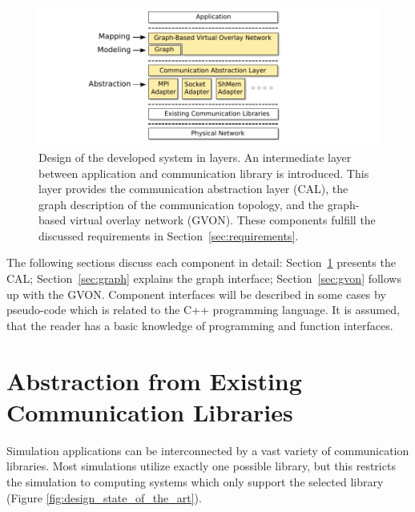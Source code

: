 \begin{figure}[H]
  \centering \includegraphics[width=\textwidth]{graphics/30_design}
  \caption{Design of the developed system in layers. An intermediate
    layer between application and communication library is introduced.
    This layer provides the communication abstraction layer (CAL), the
    graph description of the communication topology, and the
    graph-based virtual overlay network (GVON). These components
    fulfill the discussed requirements in
    Section~\ref{sec:requirements}.}
  \label{fig:design}
\end{figure}

\noindent The following sections discuss each component in detail:
Section~\ref{sec:comm_abstraction} presents the CAL;
Section~\ref{sec:graph} explains the graph interface;
Section~\ref{sec:gvon} follows up with the GVON.  Component interfaces
will be described in some cases by pseudo-code which is related to the
C++ programming language. It is assumed, that the reader has a basic
knowledge of programming and function interfaces.

\section{Abstraction from Existing Communication Libraries}
\label{sec:comm_abstraction}

Simulation applications can be interconnected by a vast variety of
communication libraries. Most simulations utilize exactly one possible
library, but this restricts the simulation to computing systems which
only support the selected library (Figure
\ref{fig:design_state_of_the_art}).

